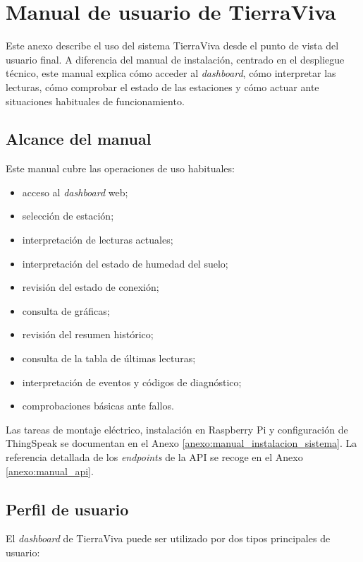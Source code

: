 \chapter{Manual de usuario de TierraViva}
\label{anexo:manual_usuario}

Este anexo describe el uso del sistema TierraViva desde el punto de vista del usuario final. A diferencia del manual de instalación, centrado en el despliegue técnico, este manual explica cómo acceder al \textit{dashboard}, cómo interpretar las lecturas, cómo comprobar el estado de las estaciones y cómo actuar ante situaciones habituales de funcionamiento.

\section{Alcance del manual}

Este manual cubre las operaciones de uso habituales:

\begin{itemize}
    \item acceso al \textit{dashboard} web;
    \item selección de estación;
    \item interpretación de lecturas actuales;
    \item interpretación del estado de humedad del suelo;
    \item revisión del estado de conexión;
    \item consulta de gráficas;
    \item revisión del resumen histórico;
    \item consulta de la tabla de últimas lecturas;
    \item interpretación de eventos y códigos de diagnóstico;
    \item comprobaciones básicas ante fallos.
\end{itemize}

Las tareas de montaje eléctrico, instalación en Raspberry Pi y configuración de ThingSpeak se documentan en el Anexo \ref{anexo:manual_instalacion_sistema}. La referencia detallada de los \textit{endpoints} de la API se recoge en el Anexo \ref{anexo:manual_api}.

\section{Perfil de usuario}

El \textit{dashboard} de TierraViva puede ser utilizado por dos tipos principales de usuario:

